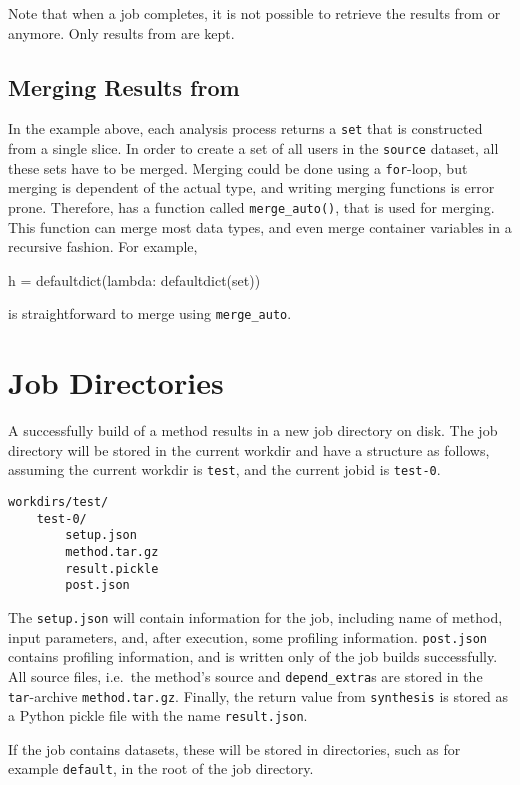 Note that when a job completes, it is not possible to retrieve the
results from \prepare or \analysis anymore.  Only results from
\synthesis are kept.

\subsection{Merging Results from \analysis}
In the example above, each analysis process returns a \texttt{set}
that is constructed from a single slice.  In order to create a set of
all users in the \texttt{source} dataset, all these sets have to be
merged.  Merging could be done using a \texttt{for}-loop, but merging
is dependent of the actual type, and writing merging functions is
error prone.  Therefore, \analysisres has a function called
\texttt{merge\_auto()}, that is used for merging.  This function can
merge most data types, and even merge container variables in a
recursive fashion.  For example,
\begin{python}
h = defaultdict(lambda: defaultdict(set))
\end{python}
is straightforward to merge using \texttt{merge\_auto}.


\section{Job Directories}
A successfully build of a method results in a new job directory on
disk.  The job directory will be stored in the current workdir and
have a structure as follows, assuming the current workdir
is \texttt{test}, and the current jobid is \texttt{test-0}.
\begin{verbatim}
workdirs/test/
    test-0/
        setup.json
        method.tar.gz
        result.pickle
        post.json
\end{verbatim}
The \texttt{setup.json} will contain information for the job,
including name of method, input parameters, and, after execution, some
profiling information.  \texttt{post.json} contains profiling
information, and is written only of the job builds successfully.  All
source files, i.e.\ the method's source and \texttt{depend\_extra}s
are stored in the \texttt{tar}-archive \texttt{method.tar.gz}.
Finally, the return value from \texttt{synthesis} is stored as a
Python pickle file with the name \texttt{result.json}.

If the job contains datasets, these will be stored in directories,
such as for example \texttt{default}, in the root of the job
directory.

